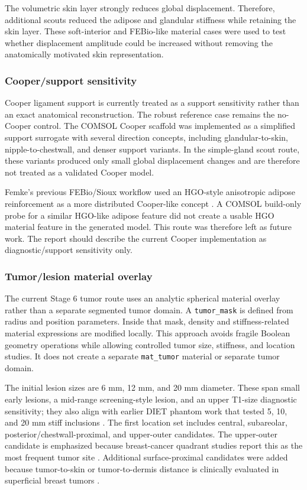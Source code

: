 The volumetric skin layer strongly reduces global displacement. Therefore, additional scouts reduced the adipose and glandular stiffness while retaining the skin layer. These soft-interior and FEBio-like material cases were used to test whether displacement amplitude could be increased without removing the anatomically motivated skin representation.

\subsubsection{Cooper/support sensitivity}

Cooper ligament support is currently treated as a support sensitivity rather than an exact anatomical reconstruction. The robust reference case remains the no-Cooper control. The COMSOL Cooper scaffold was implemented as a simplified support surrogate with several direction concepts, including glandular-to-skin, nipple-to-chestwall, and denser support variants. In the simple-gland scout route, these variants produced only small global displacement changes and are therefore not treated as a validated Cooper model.

Femke's previous FEBio/Sioux workflow used an HGO-style anisotropic adipose reinforcement as a more distributed Cooper-like concept \cite{StormEWSReport}. A COMSOL build-only probe for a similar HGO-like adipose feature did not create a usable HGO material feature in the generated model. This route was therefore left as future work. The report should describe the current Cooper implementation as diagnostic/support sensitivity only.

\subsubsection{Tumor/lesion material overlay}

The current Stage 6 tumor route uses an analytic spherical material overlay rather than a separate segmented tumor domain. A \texttt{tumor\_mask} is defined from radius and position parameters. Inside that mask, density and stiffness-related material expressions are modified locally. This approach avoids fragile Boolean geometry operations while allowing controlled tumor size, stiffness, and location studies. It does not create a separate \texttt{mat\_tumor} material or separate tumor domain.

The initial lesion sizes are 6 mm, 12 mm, and 20 mm diameter. These span small early lesions, a mid-range screening-style lesion, and an upper T1-size diagnostic sensitivity; they also align with earlier DIET phantom work that tested 5, 10, and 20 mm stiff inclusions \cite{NCI_TNM,Kashif2013}. The first location set includes central, subareolar, posterior/chestwall-proximal, and upper-outer candidates. The upper-outer candidate is emphasized because breast-cancer quadrant studies report this as the most frequent tumor site \cite{Rummel2015,Yu2017}. Additional surface-proximal candidates were added because tumor-to-skin or tumor-to-dermis distance is clinically evaluated in superficial breast tumors \cite{Brandao2023,Yur2023}.

